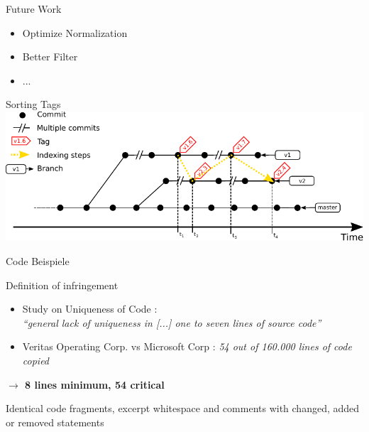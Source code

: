 \begin{frame}{Future Work}
	\begin{itemize}
		\item Optimize Normalization
		\item Better Filter
		\item ...
	\end{itemize}
\end{frame}


\begin{frame}{Sorting Tags}
	\centering
	\includegraphics[width=\linewidth]{../written/figures/tag_sort.pdf}
\end{frame}

\begin{frame}
	Code Beispiele 
\end{frame}

\begin{frame}{Definition of infringement}
\begin{itemize}
	\item Study on Uniqueness of Code \cite{2010-gabel-su-source-code-uniqueness}:\\
	\textit{\enquote{general lack of uniqueness in [...] one to seven lines of source code}}
	\item Veritas Operating Corp. vs Microsoft Corp \cite{mertzel2008copying}:
	\textit{54 out of 160.000 lines of code copied}
\end{itemize}

\begin{center}
	\textbf{$\rightarrow$ 8 lines minimum, 54 critical}
\end{center}
Identical code fragments, excerpt whitespace and comments with changed, added or removed statements
\end{frame}